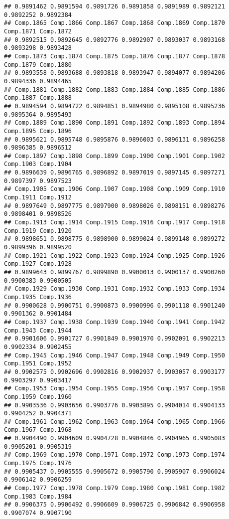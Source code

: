 \documentclass[
]{article}
\begin{document}
\begin{verbatim}
## 0.9891462 0.9891594 0.9891726 0.9891858 0.9891989 0.9892121 0.9892252 0.9892384 
## Comp.1865 Comp.1866 Comp.1867 Comp.1868 Comp.1869 Comp.1870 Comp.1871 Comp.1872 
## 0.9892515 0.9892645 0.9892776 0.9892907 0.9893037 0.9893168 0.9893298 0.9893428 
## Comp.1873 Comp.1874 Comp.1875 Comp.1876 Comp.1877 Comp.1878 Comp.1879 Comp.1880 
## 0.9893558 0.9893688 0.9893818 0.9893947 0.9894077 0.9894206 0.9894336 0.9894465 
## Comp.1881 Comp.1882 Comp.1883 Comp.1884 Comp.1885 Comp.1886 Comp.1887 Comp.1888 
## 0.9894594 0.9894722 0.9894851 0.9894980 0.9895108 0.9895236 0.9895364 0.9895493 
## Comp.1889 Comp.1890 Comp.1891 Comp.1892 Comp.1893 Comp.1894 Comp.1895 Comp.1896 
## 0.9895621 0.9895748 0.9895876 0.9896003 0.9896131 0.9896258 0.9896385 0.9896512 
## Comp.1897 Comp.1898 Comp.1899 Comp.1900 Comp.1901 Comp.1902 Comp.1903 Comp.1904 
## 0.9896639 0.9896765 0.9896892 0.9897019 0.9897145 0.9897271 0.9897397 0.9897523 
## Comp.1905 Comp.1906 Comp.1907 Comp.1908 Comp.1909 Comp.1910 Comp.1911 Comp.1912 
## 0.9897649 0.9897775 0.9897900 0.9898026 0.9898151 0.9898276 0.9898401 0.9898526 
## Comp.1913 Comp.1914 Comp.1915 Comp.1916 Comp.1917 Comp.1918 Comp.1919 Comp.1920 
## 0.9898651 0.9898775 0.9898900 0.9899024 0.9899148 0.9899272 0.9899396 0.9899520 
## Comp.1921 Comp.1922 Comp.1923 Comp.1924 Comp.1925 Comp.1926 Comp.1927 Comp.1928 
## 0.9899643 0.9899767 0.9899890 0.9900013 0.9900137 0.9900260 0.9900383 0.9900505 
## Comp.1929 Comp.1930 Comp.1931 Comp.1932 Comp.1933 Comp.1934 Comp.1935 Comp.1936 
## 0.9900628 0.9900751 0.9900873 0.9900996 0.9901118 0.9901240 0.9901362 0.9901484 
## Comp.1937 Comp.1938 Comp.1939 Comp.1940 Comp.1941 Comp.1942 Comp.1943 Comp.1944 
## 0.9901606 0.9901727 0.9901849 0.9901970 0.9902091 0.9902213 0.9902334 0.9902455 
## Comp.1945 Comp.1946 Comp.1947 Comp.1948 Comp.1949 Comp.1950 Comp.1951 Comp.1952 
## 0.9902575 0.9902696 0.9902816 0.9902937 0.9903057 0.9903177 0.9903297 0.9903417 
## Comp.1953 Comp.1954 Comp.1955 Comp.1956 Comp.1957 Comp.1958 Comp.1959 Comp.1960 
## 0.9903536 0.9903656 0.9903776 0.9903895 0.9904014 0.9904133 0.9904252 0.9904371 
## Comp.1961 Comp.1962 Comp.1963 Comp.1964 Comp.1965 Comp.1966 Comp.1967 Comp.1968 
## 0.9904490 0.9904609 0.9904728 0.9904846 0.9904965 0.9905083 0.9905201 0.9905319 
## Comp.1969 Comp.1970 Comp.1971 Comp.1972 Comp.1973 Comp.1974 Comp.1975 Comp.1976 
## 0.9905437 0.9905555 0.9905672 0.9905790 0.9905907 0.9906024 0.9906142 0.9906259 
## Comp.1977 Comp.1978 Comp.1979 Comp.1980 Comp.1981 Comp.1982 Comp.1983 Comp.1984 
## 0.9906375 0.9906492 0.9906609 0.9906725 0.9906842 0.9906958 0.9907074 0.9907190 

\end{verbatim}
\end{document}
